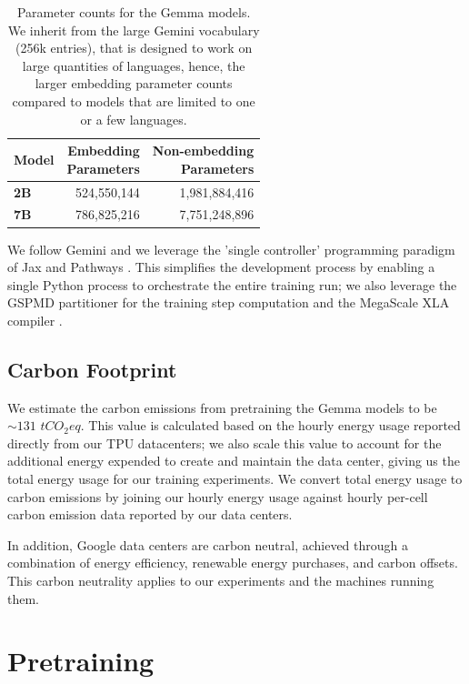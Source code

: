 \documentclass[11pt, a4paper, logo, twocolumn, copyright, nonumbering]{googledeepmind}
\begin{document}
\begin{table}
    \centering
    \begin{tabular}{l r r}
    \toprule
        Model & \makecell{Embedding\\Parameters} & \makecell{Non-embedding\\Parameters} \\
        \midrule
        \textbf{2B} & 524,550,144 &  1,981,884,416 \\
        \textbf{7B} & 786,825,216 & 7,751,248,896 \\
    \bottomrule
    \end{tabular}
    \caption{Parameter counts for the Gemma models. 
    We inherit from the large Gemini vocabulary (256k entries), that is designed to work on large quantities of languages, hence, the larger embedding parameter counts compared to models that are limited to one or a few languages.}
    \label{tab:model_param_counts}
\end{table}

We follow Gemini and we leverage the 'single controller' programming paradigm of Jax \citep{bradburyJAX} and Pathways \citep{barham2022pathways}. This simplifies the development process by enabling a single Python process to orchestrate the entire training run; we also leverage the GSPMD partitioner \citep{gspmd} for the training step computation and the MegaScale XLA compiler \citep{xla}.

\subsection{Carbon Footprint}
We estimate the carbon emissions from pretraining the Gemma models to be $\sim131$ $tCO_2 eq$. This value is calculated based on the hourly energy usage reported directly from our TPU datacenters; we also scale this value to account for the additional energy expended to create and maintain the data center, giving us the total energy usage for our training experiments. We convert total energy usage to carbon emissions by joining our hourly energy usage against hourly per-cell carbon emission data reported by our data centers. 

In addition, Google data centers are carbon neutral, achieved through a combination of energy efficiency, renewable energy purchases, and carbon offsets. This carbon neutrality applies to our experiments and the machines running them. 

\section{Pretraining}
\end{document}
